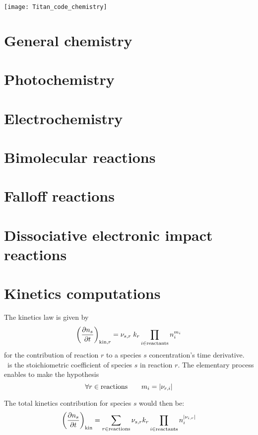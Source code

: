 \noindent\texttt{[image: Titan\_code\_chemistry]}

\section{General chemistry}


\section{Photochemistry}


\section{Electrochemistry}


\section{Bimolecular reactions}
\label{Titan_bimol_sec}


\section{Falloff reactions}


\section{Dissociative electronic impact reactions}


\section{Kinetics computations}
The kinetics law is given by
\begin{equation}
\left(\frac{\partial n_s}{\partial t}\right)_{\text{kin},r} = {\nu_{s,r}}\; k_{r} \prod_{i\in\text{reactants}}n_i^{{m_{i}}}
\end{equation}
for the contribution of reaction $r$ to a species $s$ concentration's
time derivative. \ is the stoichiometric coefficient of species
$s$ in reaction $r$. The elementary process enables to make the hypothesis
\begin{equation}
\forall r \in \text{reactions}\qquad
{m_{i}} = |{\nu_{r,i}}|
\end{equation}

The total kinetics contribution for species $s$ would then be:
\begin{equation}
\left(\frac{\partial n_s}{\partial t}\right)_\text{kin} = \sum_{r\in \text{reactions}} {\nu_{s,r}} k_{r} \prod_{i\in\text{reactants}}n_i^{|{\nu_{i,r}}|}
\label{Titan:kinetics}
\end{equation}
